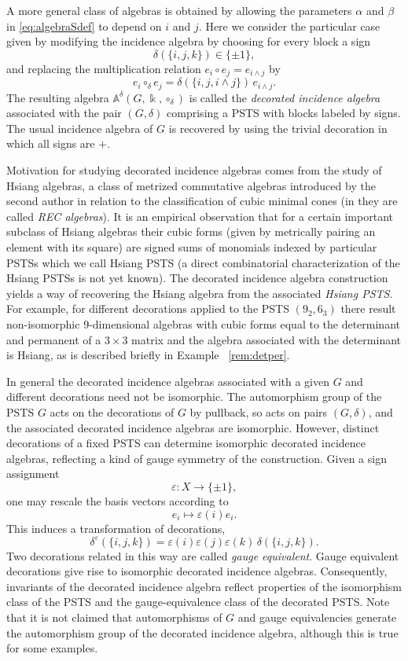 \documentclass[times,11pt,reqno]{amsproc}
\theoremstyle{definition}
\numberwithin{equation}{section}
\newcommand\fie{\Bbbk}
\def\alg{\mathbb{A}}
\begin{document}
A more general class of algebras is obtained by allowing the parameters $\alpha$ and $\beta$ in \eqref{eq:algebraSdef} to depend on $i$ and $j$. Here we consider the particular case given by modifying the incidence algebra by choosing for every block a sign
$$
\delta(\{i,j,k\})\in\{\pm1\},
$$
and replacing the multiplication relation $e_i\circ e_j=e_{i\wedge j}$
by
$$
e_i\circ_\delta e_j
=
\delta(\{i,j,i\wedge j\})\,e_{i\wedge j}.
$$
The resulting algebra $\alg^\delta(G,\fie,\circ_\delta)$ is called the \textit{decorated incidence algebra}
associated with the pair $(G,\delta)$ comprising a PSTS with blocks labeled by signs. The usual incidence algebra of $G$ is recovered by using the trivial decoration in which all signs are $+$.

Motivation for studying decorated incidence algebras comes from the study of Hsiang algebras, a class of metrized commutative algebras introduced by the second author in relation to the classification of cubic minimal cones \cite{Nadirashvili-Tkachev-Vladuts, Fox-Tkachev} (in \cite{Nadirashvili-Tkachev-Vladuts} they are called \emph{REC algebras}). It is an empirical observation that for a certain important subclass of Hsiang algebras their cubic forms (given by metrically pairing an element with its square) are signed sums of monomials indexed by particular PSTSs which we call Hsiang PSTS (a direct combinatorial characterization of the Hsiang PSTSs is not yet known). The decorated incidence algebra construction yields a way of recovering the Hsiang algebra from the associated \emph{Hsiang PSTS}. For example, for different decorations applied to the PSTS $(9_2, 6_3)$ there result non-isomorphic $9$-dimensional algebras with cubic forms equal to the determinant and permanent of a $3\times 3$ matrix and the algebra associated with the determinant is Hsiang, as is described briefly in Example~ \ref{rem:detper}.


In general the decorated incidence algebras associated with a given $G$ and different decorations need not be isomorphic. The automorphism group of the PSTS $G$ acts on the decorations of $G$ by pullback, so acts on pairs $(G, \delta)$, and the associated decorated incidence algebras are isomorphic. However, distinct decorations of a fixed PSTS can determine isomorphic decorated incidence algebras, reflecting a kind of gauge symmetry of the construction. Given a
sign assignment
$$
\varepsilon:X\to\{\pm1\},
$$
one may rescale the basis vectors according to
$$
e_i\mapsto \varepsilon(i)e_i.
$$
This induces a transformation of decorations,
$$
\delta^\varepsilon(\{i,j,k\})
=
\varepsilon(i)\varepsilon(j)\varepsilon(k)\,
\delta(\{i,j,k\}).
$$
Two decorations related in this way are called \textit{gauge equivalent}. Gauge equivalent decorations give rise to isomorphic decorated incidence
algebras. Consequently, invariants of the decorated incidence algebra reflect properties of the isomorphism class of the PSTS and the gauge-equivalence class of the decorated PSTS. Note that it is not claimed that automorphisms of $G$ and gauge equivalencies generate the automorphism group of the decorated incidence algebra, although this is true for some examples.
\end{document}
